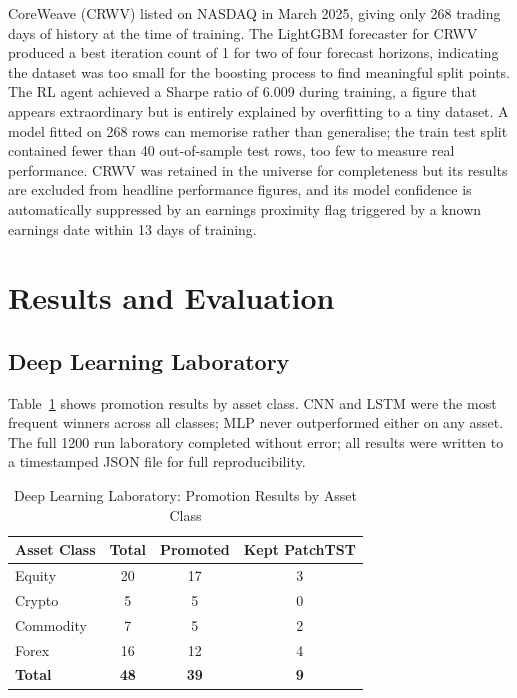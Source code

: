 \documentclass[journal]{IEEEtran}
\begin{document}
CoreWeave (CRWV) listed on NASDAQ in March 2025, giving only 268 trading
days of history at the time of training. The LightGBM forecaster for CRWV
produced a best iteration count of 1 for two of four forecast horizons,
indicating the dataset was too small for the boosting process to find
meaningful split points. The RL agent achieved a Sharpe ratio of 6.009
during training, a figure that appears extraordinary but is entirely
explained by overfitting to a tiny dataset. A model fitted on 268 rows
can memorise rather than generalise; the train test split contained fewer
than 40 out-of-sample test rows, too few to measure real performance.
CRWV was retained in the universe for completeness but its results are
excluded from headline performance figures, and its model confidence is
automatically suppressed by an earnings proximity flag triggered by a
known earnings date within 13 days of training.

\section{Results and Evaluation}
\label{sec:results}

\subsection{Deep Learning Laboratory}

Table~\ref{tab:lab_summary} shows promotion results by asset class. CNN
and LSTM were the most frequent winners across all classes; MLP never
outperformed either on any asset. The full 1200 run laboratory completed
without error; all results were written to a timestamped JSON file for
full reproducibility.

\begin{table}[!t]
\renewcommand{\arraystretch}{1.3}
\caption{Deep Learning Laboratory: Promotion Results by Asset Class}
\label{tab:lab_summary}
\centering
\begin{tabular}{|l|c|c|c|}
\hline
\textbf{Asset Class} & \textbf{Total} & \textbf{Promoted}
  & \textbf{Kept PatchTST} \\
\hline
Equity    & 20 & 17 & 3 \\
Crypto    &  5 &  5 & 0 \\
Commodity &  7 &  5 & 2 \\
Forex     & 16 & 12 & 4 \\
\hline
\textbf{Total} & \textbf{48} & \textbf{39} & \textbf{9} \\
\hline
\end{tabular}
\end{table}
\end{document}
